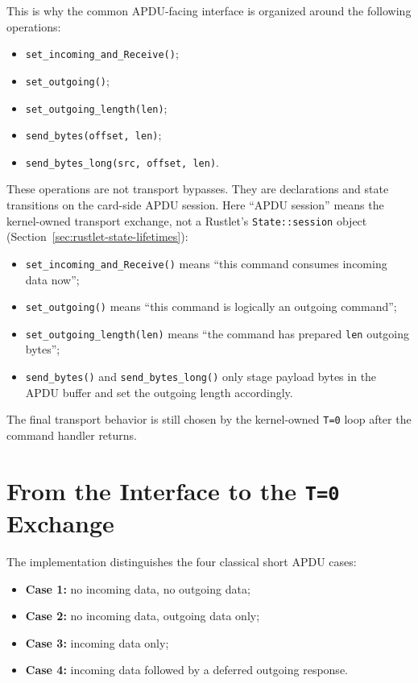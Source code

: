 This is why the common APDU-facing interface is organized around the
following operations:
\begin{itemize}
\item \texttt{set\_incoming\_and\_Receive()};
\item \texttt{set\_outgoing()};
\item \texttt{set\_outgoing\_length(len)};
\item \texttt{send\_bytes(offset, len)};
\item \texttt{send\_bytes\_long(src, offset, len)}.
\end{itemize}

These operations are not transport bypasses. They are declarations and
state transitions on the card-side APDU session. Here ``APDU session'' means
the kernel-owned transport exchange, not a Rustlet's \texttt{State::session}
object (Section~\ref{sec:rustlet-state-lifetimes}):
\begin{itemize}
\item \texttt{set\_incoming\_and\_Receive()} means ``this command consumes
  incoming data now'';
\item \texttt{set\_outgoing()} means ``this command is logically an
  outgoing command'';
\item \texttt{set\_outgoing\_length(len)} means ``the command has prepared
  \texttt{len} outgoing bytes'';
\item \texttt{send\_bytes()} and \texttt{send\_bytes\_long()} only stage
  payload bytes in the APDU buffer and set the outgoing length
  accordingly.
\end{itemize}

The final transport behavior is still chosen by the kernel-owned
\texttt{T=0} loop after the command handler returns.

\section{From the Interface to the \texttt{T=0} Exchange}

The implementation distinguishes the four classical short APDU cases:
\begin{itemize}
\item \textbf{Case 1:} no incoming data, no outgoing data;
\item \textbf{Case 2:} no incoming data, outgoing data only;
\item \textbf{Case 3:} incoming data only;
\item \textbf{Case 4:} incoming data followed by a deferred outgoing
  response.
\end{itemize}

